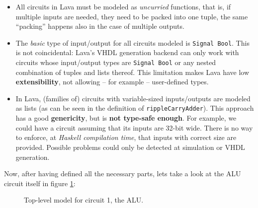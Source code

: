 \documentclass[a4paper]{article}
\begin{document}
                \begin{itemize}
                    \item All circuits in Lava must be modeled as \emph{uncurried} functions, that
                        is, if multiple inputs are needed, they need to be packed into one tuple, the
                        same ``packing'' happens also in the case of multiple outputs.

                    \item The \emph{basic} type of input/output for all circuits modeled is
                        \texttt{Signal Bool}. This is not coincidental: Lava's VHDL generation
                        backend can only work with circuits whose input/output types are
                        \texttt{Signal Bool} or any nested combination of tuples and lists thereof.
                        This limitation makes Lava have low \textbf{extensibility}, not allowing
                        -- for example -- user-defined types.

                    \item In Lava, (families of) circuits with variable-sized inputs/outputs are
                        modeled as lists (as can be seen in the definition of
                        \texttt{rippleCarryAdder}). This approach has a good \textbf{genericity},
                        but is \textbf{not type-safe enough}. For example, we could have a circuit
                        assuming that its inputs are 32-bit wide.  There is no way to enforce, at
                        \emph{Haskell compilation time}, that inputs with correct size are
                        provided.  Possible problems could only be detected at simulation or VHDL
                        generation.
                \end{itemize}

                Now, after having defined all the necessary parts, lets take a look at the
                ALU circuit itself in figure \ref{fig:lava-circuit1-model-alu}:

                \begin{figure}[h!]
                    \begin{center}
                    \end{center}
                    \caption{Top-level model for circuit 1, the ALU.
                        \label{fig:lava-circuit1-model-alu}}
                \end{figure}
\end{document}
